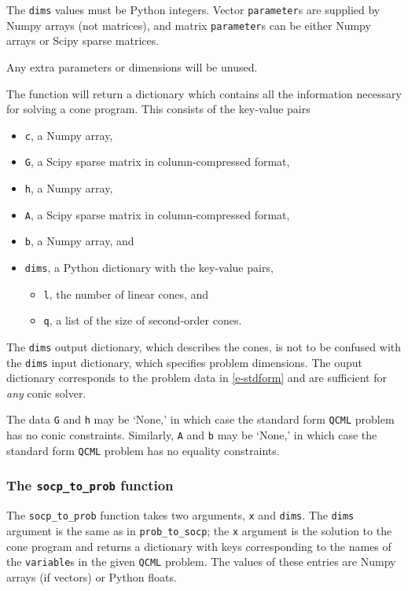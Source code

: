 \documentclass[11pt]{article}
\def\qcml{\texttt{QCML}\xspace}
\begin{document}
The {\tt dims} values must be Python integers. Vector {\tt parameter}s are
supplied by Numpy arrays (not matrices), and matrix {\tt parameter}s can be
either Numpy arrays or Scipy sparse matrices.

Any extra parameters or dimensions will be unused. 

The function will return a dictionary which contains all the information
necessary for solving a cone program. This consists of the key-value pairs
\begin{itemize}
  \item {\tt c}, a Numpy array,
  \item {\tt G}, a Scipy sparse matrix in column-compressed format,
  \item {\tt h}, a Numpy array,
  \item {\tt A}, a Scipy sparse matrix in column-compressed format,
  \item {\tt b}, a Numpy array, and
  \item {\tt dims}, a Python dictionary with the key-value pairs,
  \begin{itemize}
    \item {\tt l}, the number of linear cones, and
    \item {\tt q}, a list of the size of second-order cones.
  \end{itemize}
\end{itemize}
The {\tt dims} output dictionary, which describes the cones, 
is not to be confused with the {\tt dims} input 
dictionary, which specifies problem dimensions. 
The ouput dictionary corresponds to the problem data in \eqref{e-stdform}
and are sufficient for \emph{any} conic solver.

The data {\tt G} and {\tt h} may be `None,' in which case the standard form
\qcml problem has no conic constraints. Similarly, {\tt A} and {\tt b} may be
`None,' in which case the standard form \qcml problem has no equality
constraints.

\subsubsection{The {\tt socp\_to\_prob} function}
The {\tt socp\_to\_prob} function takes two arguments, {\tt x} and {\tt dims}.
The {\tt dims} argument is the same as in {\tt prob\_to\_socp}; the {\tt x}
argument is
the solution to the cone program and returns a dictionary with keys
corresponding to the names of the {\tt variable}s in the given \qcml problem.
The values of these entries are Numpy arrays (if vectors) or Python floats.
\end{document}
